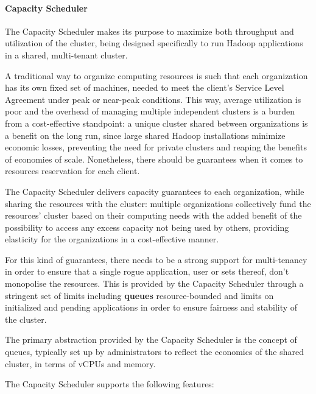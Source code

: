 \paragraph{Capacity Scheduler}

The Capacity Scheduler makes its purpose to maximize both throughput and utilization of the cluster, being designed specifically to run Hadoop applications in a shared, multi-tenant cluster.

A traditional way to organize computing resources is such that each organization has its own fixed set of machines, needed to meet the client’s Service Level Agreement under peak or near-peak conditions. This way, average utilization is poor and the overhead of managing multiple independent clusters is a burden from a cost-effective standpoint: a unique cluster shared between organizations is a benefit on the long run, since large shared Hadoop installations minimize economic losses, preventing the need for private clusters and reaping the benefits of economies of scale. Nonetheless, there should be guarantees when it comes to resources reservation for each client.

The Capacity Scheduler delivers capacity guarantees to each organization, while sharing the resources with the cluster: multiple organizations collectively fund the resources' cluster based on their computing needs with the added benefit of the possibility to access any excess capacity not being used by others, providing elasticity for the organizations in a cost-effective manner.

For this kind of guarantees, there needs to be a strong support for multi-tenancy in order to ensure that a single rogue application, user or sets thereof, don't monopolise the resources. This is provided by the Capacity Scheduler through a stringent set of limits including \textbf{queues} resource-bounded and limits on initialized and pending applications in order to ensure fairness and stability of the cluster.

The primary abstraction provided by the Capacity Scheduler is the concept of queues, typically set up by administrators to reflect the economics of the shared cluster, in terms of vCPUs and memory.

The Capacity Scheduler supports the following features:

